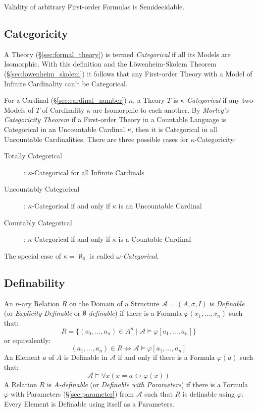 Validity of arbitrary First-order Formulas is Semidecidable.



\subsection{Categoricity}\label{sec:categoricity}

A Theory (\S\ref{sec:formal_theory}) is termed \emph{Categorical} if
all its Models are Isomorphic. With this definition and the
L\"owenheim-Skolem Theorem (\S\ref{sec:lowenheim_skolem}) it follows
that any First-order Theory with a Model of Infinite Cardinality can't
be Categorical.

For a Cardinal (\S\ref{sec:cardinal_number}) $\kappa$, a Theory $T$ is
\emph{$\kappa$-Categorical} if any two Models of $T$ of Cardinality
$\kappa$ are Isomorphic to each another. By \emph{Morley's
  Categoricity Theorem}\cite{morley65} if a First-order Theory in a
Countable Language is Categorical in an Uncountable Cardinal $\kappa$,
then it is Categorical in all Uncountable Cardinalities. There are
three possible cases for $\kappa$-Categoricity:
\begin{description}
\item[Totally Categorical]: $\kappa$-Categorical for all Infinite
  Cardinals
\item[Uncountably Categorical]: $\kappa$-Categorical if and only if
  $\kappa$ is an Uncountable Cardinal
\item[Countably Categorical]: $\kappa$-Categorical if and only if
  $\kappa$ is a Countable Cardinal
\end{description}
The special case of $\kappa = \aleph_0$ is called
\emph{$\omega$-Categorical}.



\subsection{Definability}\label{sec:definability}

An $n$-ary Relation $R$ on the Domain of a Structure $\mathcal{A} =
(A, \sigma, I)$ is \emph{Definable} (or \emph{Explicity Definable} or
\emph{$\emptyset$-definable}) if there is a Formula $\varphi
(x_1,\ldots,x_n)$ such that:
\[
  R = \{(a_1,\ldots,a_n) \in A^n \;|\; \mathcal{A} \models \varphi
    [a_1, \ldots, a_n]\}
\]
or equivalently:
\[
  (a_1, \ldots, a_n) \in R \Leftrightarrow \mathcal{A} \models
    \varphi[a_1, \ldots, a_n]
\]
An Element $a$ of $A$ is Definable in $\mathcal{A}$ if and only if
there is a Formula $\varphi(a)$ such that:
\[
  \mathcal{A} \models \forall x (x = a \leftrightarrow \varphi(x))
\]
A Relation $R$ is \emph{$A$-definable} (or \emph{Definable with
  Parameters}) if there is a Formula $\varphi$ with Parameters
(\S\ref{sec:parameter}) from $\mathcal{A}$ such that $R$ is definable
using $\varphi$. Every Element is Definable using itself as a
Parameters.



